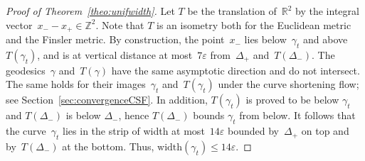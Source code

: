\documentclass[AHL,Unicode,longabstracts,published]{cedram}
\newcommand{\Z}{\mathbb{Z}}
\newcommand{\R}{\mathbb{R}}
\newcommand{\width}{\mathrm{width}}
\begin{document}
\begin{proof}[Proof of Theorem~\ref{theo:unifwidth}]
Let $T$ be the translation of~$\R^2$ by the integral vector~$x_--x_+ \in \Z^2$. Note that $T$ is an isometry both for the Euclidean metric and the Finsler metric. By construction, the point~$x_-$ lies below~$\gamma_t$ and above $T(\gamma_t)$, and is at vertical distance at most~$7\varepsilon$ from~$\Delta_+$ and~$T(\Delta_-)$. The geodesics~$\gamma$ and~$T(\gamma)$ have the same asymptotic direction and do not intersect. The same holds for their images~$\gamma_t$ and~$T(\gamma_t)$ under the curve shortening flow; see Section~\ref{sec:convergenceCSF}. In addition, $T(\gamma_{t})$ is proved to be below $\gamma_{t}$ and $T(\Delta_{-})$ is below $\Delta_{-}$, hence $T(\Delta_{-})$ bounds $\gamma_{t}$ from below. It follows that the curve~$\gamma_t$ lies in the strip of width at most~$14 \varepsilon$ bounded by~$\Delta_+$ on top and by~$T(\Delta_-)$ at the bottom. Thus, $\width(\gamma_t) \leq 14 \varepsilon$.
\end{proof}
\end{document}
